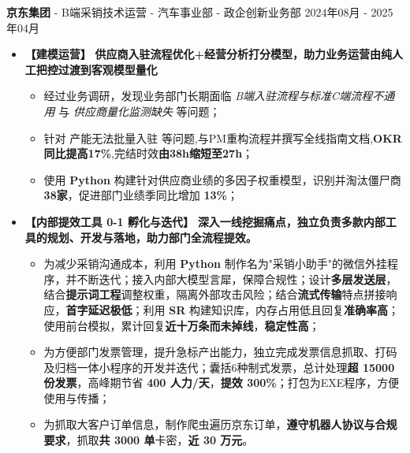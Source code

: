 \documentclass[10pt,a4paper]{article}
\begin{document}
{\fontsize{12pt}{14.4pt}\selectfont\noindent\textbf{京{\hspace{0.3em}}东{\hspace{0.3em}}集{\hspace{0.3em}}团} - B端采销技术运营 - 汽车事业部 - 政企创新业务部 \hfill 2024年08月 - 2025年04月\par}
\begin{itemize}[leftmargin=1em, label=, itemsep=0.35ex, topsep=0.05ex]
\item {\fontsize{10.5pt}{12.6pt}\selectfont\textbf{【建模运营】}} \textbf{供应商入驻流程优化+经营分析打分模型，助力业务运营由纯人工把控过渡到客观模型量化}
  \begin{itemize}
    \item 经过业务调研，发现业务部门长期面临 \textit{B端入驻流程与标准C端流程不通用} 与 \textit{供应商量化监测缺失} 等问题；
    \item 针对 产能无法批量入驻 等问题,与PM重构流程并撰写全线指南文档,\textbf{OKR同比提高17\%},完结时效\textbf{由38h缩短至27h}；
    \item 使用 \textbf{Python} 构建针对供应商业绩的多因子权重模型，识别并淘汰僵尸商 \textbf{38家}，促进部门业绩季同比增加 \textbf{13\%}；
  \end{itemize}
\item {\fontsize{10.5pt}{12.6pt}\selectfont\textbf{【内部提效工具 0-1 孵化与迭代】}} \textbf{深入一线挖掘痛点，独立负责多款内部工具的规划、开发与落地，助力部门全流程提效。}
  \begin{itemize}
    \item 为减少采销沟通成本，利用 \textbf{Python} 制作名为"采销小助手"的微信外挂程序，并不断迭代；接入内部大模型言犀，保障合规性；设计\textbf{多层发送层}，结合\textbf{提示词工程}调整权重，隔离外部攻击风险；结合\textbf{流式传输}特点拼接响应，\textbf{首字延迟极低}；利用 \textbf{SR} 构建知识库，内存占用低且回复\textbf{准确率高}；使用前台模拟，累计回复\textbf{近十万条而未掉线}，\textbf{稳定性高}；
    \item 为方便部门发票管理，提升急标产出能力，独立完成发票信息抓取、打码及归档一体小程序的开发并迭代；囊括6种制式发票，总计处理\textbf{超 15000 份发票}，高峰期节省 \textbf{400 人力/天}，\textbf{提效 300\%}；打包为EXE程序，方便使用与传播；
    \item 为抓取大客户订单信息，制作爬虫遍历京东订单，\textbf{遵守机器人协议与合规要求}，抓取\textbf{共 3000 单}卡密，\textbf{近 30 万元}。
  \end{itemize}
\end{itemize}
\vspace{0.3ex}
\end{document}
